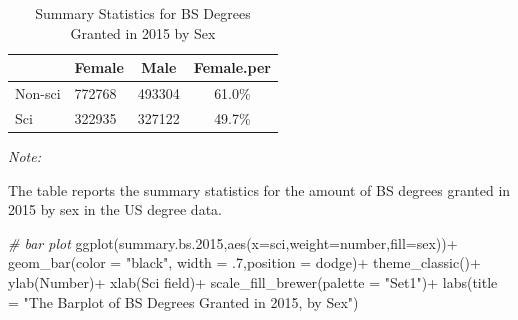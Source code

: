 \documentclass[
  12pt,
]{article}
\newenvironment{Shaded}{\begin{snugshade}}{\end{snugshade}}
\newcommand{\AttributeTok}[1]{\textcolor[rgb]{0.77,0.63,0.00}{#1}}
\newcommand{\CommentTok}[1]{\textcolor[rgb]{0.56,0.35,0.01}{\textit{#1}}}
\newcommand{\DecValTok}[1]{\textcolor[rgb]{0.00,0.00,0.81}{#1}}
\newcommand{\FloatTok}[1]{\textcolor[rgb]{0.00,0.00,0.81}{#1}}
\newcommand{\FunctionTok}[1]{\textcolor[rgb]{0.00,0.00,0.00}{#1}}
\newcommand{\NormalTok}[1]{#1}
\newcommand{\SpecialCharTok}[1]{\textcolor[rgb]{0.00,0.00,0.00}{#1}}
\newcommand{\StringTok}[1]{\textcolor[rgb]{0.31,0.60,0.02}{#1}}
\begin{document}
\begin{table}[H]

\caption{\label{tab:unnamed-chunk-8}Summary Statistics for BS Degrees Granted in 2015 by Sex}
\centering
\begin{threeparttable}
\begin{tabular}[t]{llcc}
\toprule
  & Female & Male & Female.per\\
\midrule
Non-sci & 772768 & 493304 & 61.0\%\\
Sci & 322935 & 327122 & 49.7\%\\
\bottomrule
\end{tabular}
\begin{tablenotes}
\item \textit{Note: } 
\item The table reports the summary statistics for the amount of BS degrees granted in 2015 by sex in the US degree data.
\end{tablenotes}
\end{threeparttable}
\end{table}

\begin{Shaded}
\begin{Highlighting}[]
\CommentTok{\# bar plot}
\FunctionTok{ggplot}\NormalTok{(summary.bs}\FloatTok{.2015}\NormalTok{,}\FunctionTok{aes}\NormalTok{(}\AttributeTok{x=}\NormalTok{sci,}\AttributeTok{weight=}\NormalTok{number,}\AttributeTok{fill=}\NormalTok{sex))}\SpecialCharTok{+}
  \FunctionTok{geom\_bar}\NormalTok{(}\AttributeTok{color =} \StringTok{"black"}\NormalTok{, }\AttributeTok{width =}\NormalTok{ .}\DecValTok{7}\NormalTok{,}\AttributeTok{position =} \StringTok{\textquotesingle{}dodge\textquotesingle{}}\NormalTok{)}\SpecialCharTok{+}
  \FunctionTok{theme\_classic}\NormalTok{()}\SpecialCharTok{+}
  \FunctionTok{ylab}\NormalTok{(}\StringTok{\textquotesingle{}Number\textquotesingle{}}\NormalTok{)}\SpecialCharTok{+}
  \FunctionTok{xlab}\NormalTok{(}\StringTok{\textquotesingle{}Sci field\textquotesingle{}}\NormalTok{)}\SpecialCharTok{+}
  \FunctionTok{scale\_fill\_brewer}\NormalTok{(}\AttributeTok{palette =} \StringTok{"Set1"}\NormalTok{)}\SpecialCharTok{+}
  \FunctionTok{labs}\NormalTok{(}\AttributeTok{title =} \StringTok{"The Barplot of BS Degrees Granted in 2015, by Sex"}\NormalTok{)}
\end{Highlighting}
\end{Shaded}
\end{document}
